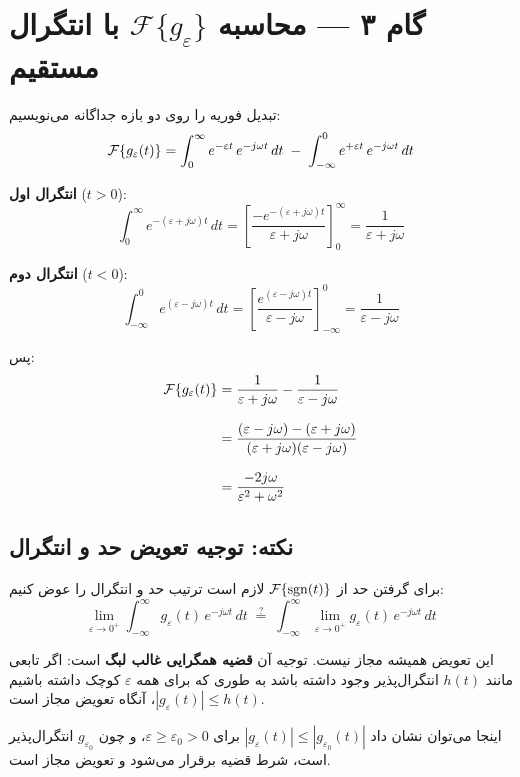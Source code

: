 \section*{گام ۳ --- محاسبه \textenglish{$\mathcal{F}\{g_\varepsilon\}$} با انتگرال مستقیم}
 
تبدیل فوریه را روی دو بازه جداگانه می‌نویسیم:
\[
  \mathcal{F}\!\left\{g_\varepsilon(t)\right\}
  = \int_{0}^{\infty} e^{-\varepsilon t}\,e^{-j\omega t}\,dt
  \;-\;
  \int_{-\infty}^{0} e^{+\varepsilon t}\,e^{-j\omega t}\,dt
\]
 
\textbf{انتگرال اول} ($t > 0$):
\[
  \int_{0}^{\infty} e^{-(\varepsilon+j\omega)t}\,dt
  = \left[\frac{-e^{-(\varepsilon+j\omega)t}}{\varepsilon+j\omega}\right]_{0}^{\infty}
  = \frac{1}{\varepsilon + j\omega}
\]
 
\textbf{انتگرال دوم} ($t < 0$):
\[
  \int_{-\infty}^{0} e^{(\varepsilon-j\omega)t}\,dt
  = \left[\frac{e^{(\varepsilon-j\omega)t}}{\varepsilon-j\omega}\right]_{-\infty}^{0}
  = \frac{1}{\varepsilon - j\omega}
\]
 
پس:
\begin{align*}
  \mathcal{F}\!\left\{g_\varepsilon(t)\right\}
  &= \frac{1}{\varepsilon+j\omega} - \frac{1}{\varepsilon-j\omega} \\[8pt]
  &= \frac{(\varepsilon - j\omega) - (\varepsilon + j\omega)}{(\varepsilon+j\omega)(\varepsilon-j\omega)} \\[8pt]
  &= \frac{-2j\omega}{\varepsilon^2 + \omega^2}
\end{align*}
 
\subsection*{نکته: توجیه تعویض حد و انتگرال}
 
برای گرفتن حد از $\mathcal{F}\!\left\{\operatorname{sgn}(t)\right\}$ لازم است ترتیب حد و انتگرال را عوض کنیم:
\[
  \lim_{\varepsilon \to 0^+} \int_{-\infty}^{\infty} g_\varepsilon(t)\, e^{-j\omega t}\, dt
  \;\overset{?}{=}\;
  \int_{-\infty}^{\infty} \lim_{\varepsilon \to 0^+} g_\varepsilon(t)\, e^{-j\omega t}\, dt
\]
 
این تعویض همیشه مجاز نیست. توجیه آن \textbf{قضیه همگرایی غالب لبگ} است:
اگر تابعی مانند $h(t)$ انتگرال‌پذیر وجود داشته باشد به طوری که برای همه $\varepsilon$
کوچک داشته باشیم $|g_\varepsilon(t)| \leq h(t)$، آنگاه تعویض مجاز است.
 
اینجا می‌توان نشان داد $|g_\varepsilon(t)| \leq |{g_{\varepsilon_0}(t)}|$ برای
$\varepsilon \geq \varepsilon_0 > 0$، و چون $g_{\varepsilon_0}$ انتگرال‌پذیر است،
شرط قضیه برقرار می‌شود و تعویض مجاز است.
 
